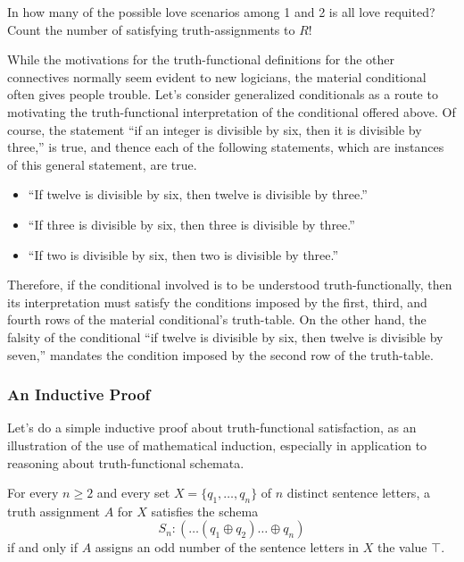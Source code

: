 \begin{aside}
    In how many of the possible love scenarios among 1 and 2 is all love requited? Count the number of satisfying truth-assignments to $R$!
\end{aside}

While the motivations for the truth-functional definitions for the other connectives normally seem evident to new logicians, the material conditional often gives people trouble. Let's consider generalized conditionals as a route to motivating the truth-functional interpretation of the conditional offered above. Of course, the statement ``if an integer is divisible by six, then it is divisible by three,'' is true, and thence each of the following statements, which are instances of this
general statement, are true.
\begin{itemize}
\item ``If twelve is divisible by six, then twelve is divisible by three.''
\item ``If three is divisible by six, then three is divisible by three.''
\item ``If two is divisible by six, then two is divisible by three.''
\end{itemize}

Therefore, if the conditional involved is to be understood truth-functionally, then its interpretation must satisfy the conditions imposed by the first, third, and fourth rows of the material conditional's truth-table. On the other hand, the falsity of the conditional ``if twelve is divisible by six, then twelve is divisible by seven,'' mandates the condition imposed by the second row of the truth-table.

\subsubsection*{An Inductive Proof}
Let's do a simple inductive proof about truth-functional satisfaction, as an illustration of the use of mathematical induction, especially in application to reasoning about truth-functional schemata.

\begin{proposition}\label{parity-prop}
For every $n\geq 2$ and every set $X=\{q_1,\ldots,q_n\}$ of $n$ distinct sentence letters, a truth assignment $A$ for $X$ satisfies the schema
\[S_n: (\ldots(q_1\oplus q_2)\ldots\oplus q_n)\]
if and only if $A$ assigns an odd number of the sentence letters in $X$ the value $\top$.
\end{proposition}

